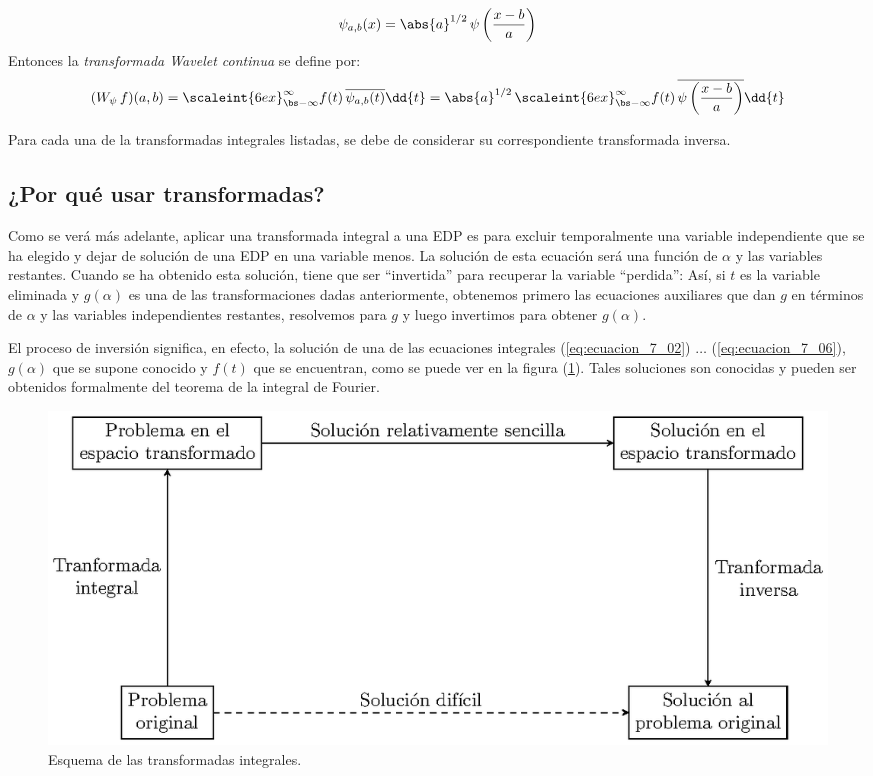\begin{enumerate}
\begin{align*}
\psi_{a, b} (x) = \abs{a}^{1/2} \, \psi \left( \dfrac{x - b}{a} \right)
\end{align*}
Entonces la \emph{transformada Wavelet continua} se define por:
\begin{align*}
(W_{\psi} \, f) (a, b) = \scaleint{6ex}_{\bs -\infty}^{\infty} f(t) \, \overline{\psi_{a, b} (t)} \dd{t} = \abs{a}^{1/2} \, \scaleint{6ex}_{\bs -\infty}^{\infty} f(t) \, \overline{\psi \left( \dfrac{x - b}{a} \right)} \dd{t}
\end{align*}
\end{enumerate}
Para cada una de la transformadas integrales listadas, se debe de considerar su correspondiente transformada inversa.

\subsection{¿Por qué usar transformadas?}

Como se verá más adelante, aplicar una transformada integral a una EDP es para excluir temporalmente una variable independiente que se ha elegido y dejar de solución de una EDP en una variable menos. La solución de esta ecuación será una función de $\alpha$ y las variables restantes. Cuando se ha obtenido esta solución, tiene que ser \enquote{invertida} para recuperar la variable \enquote{perdida}: Así, si $t$ es la variable eliminada y $g (\alpha)$ es una de las transformaciones dadas anteriormente, obtenemos primero las ecuaciones auxiliares que dan $g$ en términos de $\alpha$ y las variables independientes restantes, resolvemos para $g$ y luego invertimos para obtener $g(\alpha)$.
\par
El proceso de inversión significa, en efecto, la solución de una de las ecuaciones integrales (\ref{eq:ecuacion_7_02}) $\ldots$ (\ref{eq:ecuacion_7_06}), $g (\alpha)$ que se supone conocido y $f(t)$ que se encuentran, como se puede ver en la figura (\ref{fig:figura_01}). Tales soluciones son conocidas y pueden ser obtenidos formalmente del teorema de la integral de Fourier.
\begin{figure}[H]
    \centering
    \includegraphics[scale=1]{Imagenes/esquema_transformadas.eps}
    \caption{Esquema de las transformadas integrales.}
    \label{fig:figura_01}
\end{figure}

